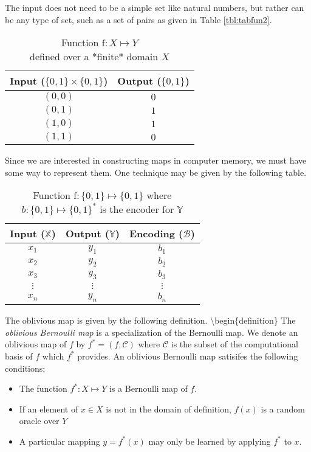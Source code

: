 \documentclass[
  letterpaper,
  DIV=11,
  numbers=noendperiod]{scrartcl}
\theoremstyle{remark}
\begin{document}
The input does not need to be a simple set like natural numbers, but
rather can be any type of set, such as a set of pairs as given in Table
\ref{tbl:tabfun2}.

\begin{table}
\centering
\caption{Function $\mathrm{f} \colon X \mapsto Y$\\defined over a *finite* domain $X$}

\begin{tabular}{|c c|} 
\hline
Input ($\{0,1\} \times \{0,1\}$) & Output ($\{0,1\}$)\\
\hline
    $(0,0)$ & $0$\\
    $(0,1)$ & $1$\\
    $(1,0)$ & $1$\\
    $(1,1)$ & $0$\\    
\hline
\end{tabular}
\end{table}

Since we are interested in constructing maps in computer memory, we must
have some way to represent them. One technique may be given by the
following table.

\begin{table}
\centering
\caption{Function $\mathrm{f} \colon \{0,1\} \mapsto \{0,1\}$ where $b : \{0,1\} \mapsto \{0,1\}^*$ is the encoder for $\mathbb{Y}$}

\begin{tabular}{|c c c|} 
\hline
Input ($\mathbb{X}$) & Output ($\mathbb{Y}$) & Encoding ($\mathcal{B}$)\\
\hline
    $x_1$ & $y_1$ & $b_1$\\
    $x_2$ & $y_2$ & $b_2$\\
    $x_3$ & $y_3$ & $b_3$\\
    $\vdots$ & $\vdots$ & $\vdots$\\
    $x_n$ & $y_n$ & $b_n$\\
\hline
\end{tabular}
\end{table}

The oblivious map is given by the following definition.
\textbackslash begin\{definition\} The \emph{oblivious Bernoulli map} is
a specialization of the Bernoulli map. We denote an oblivious map of
\(f\) by \(f^* = (f,\mathcal{C})\) where \(\mathcal{C}\) is the subset
of the computational basis of \(f\) which \(f^*\) provides. An oblivious
Bernoulli map satisifes the following conditions:

\begin{itemize}
\item
  The function \(f^* : X \mapsto Y\) is a Bernoulli map of \(f\).
\item
  If an element of \(x \in X\) is not in the domain of definition,
  \(f(x)\) is a random oracle over \(Y\)
\item
  A particular mapping \(y = f^*(x)\) may only be learned by applying
  \(f^*\) to \(x\).
\end{itemize}
\end{document}

